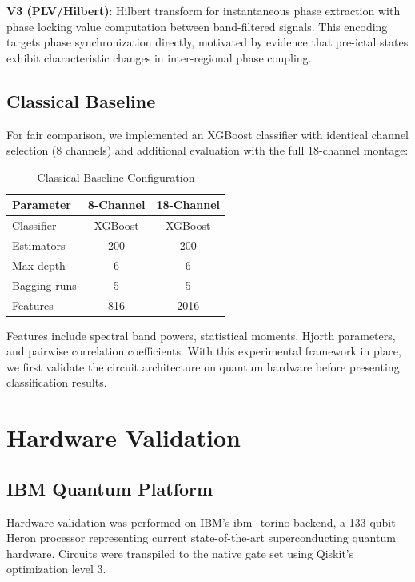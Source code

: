 \documentclass[11pt,a4paper]{article}
\begin{document}
\textbf{V3 (PLV/Hilbert)}: Hilbert transform for instantaneous phase extraction with phase locking value computation between band-filtered signals. This encoding targets phase synchronization directly, motivated by evidence that pre-ictal states exhibit characteristic changes in inter-regional phase coupling.

\subsection{Classical Baseline}

For fair comparison, we implemented an XGBoost classifier with identical channel selection (8 channels) and additional evaluation with the full 18-channel montage:

\begin{table}[htbp]
\centering
\caption{Classical Baseline Configuration}
\label{tab:classical}
\begin{tabular}{lcc}
\toprule
Parameter & 8-Channel & 18-Channel \\
\midrule
Classifier & XGBoost & XGBoost \\
Estimators & 200 & 200 \\
Max depth & 6 & 6 \\
Bagging runs & 5 & 5 \\
Features & 816 & 2016 \\
\bottomrule
\end{tabular}
\end{table}

Features include spectral band powers, statistical moments, Hjorth parameters, and pairwise correlation coefficients. With this experimental framework in place, we first validate the circuit architecture on quantum hardware before presenting classification results.

\section{Hardware Validation}

\subsection{IBM Quantum Platform}

Hardware validation was performed on IBM's ibm\_torino backend, a 133-qubit Heron processor representing current state-of-the-art superconducting quantum hardware. Circuits were transpiled to the native gate set using Qiskit's optimization level 3.
\end{document}
